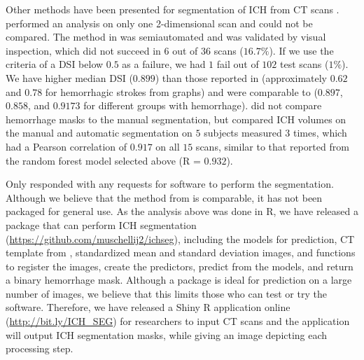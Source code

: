 \documentclass{elsarticle_nonatbib}\usepackage[]{graphicx}\usepackage[]{color}
\begin{document}
Other methods have been presented for segmentation of ICH from CT scans \citep{ gillebert_automated_2014, prakash_segmentation_2012, loncaric_hierarchical_1996, loncaric_quantitative_1999, perez_set_2007}.  \citet{loncaric_hierarchical_1996} performed an analysis on only one 2-dimensional scan and could not be compared.  The method in \citet{perez_set_2007} was semiautomated and was validated by visual inspection, which did not succeed in $6$ out of $36$ scans ($16.7\%$).  If we use the criteria of a DSI below $0.5$ as a failure, we had $1$ fail out of $102$ test scans ($1\%$).  We have higher median DSI ($0.899$) than those reported in \citet{gillebert_automated_2014} (approximately $0.62$ and $0.78$ for hemorrhagic strokes from graphs) and were comparable to \citep{prakash_segmentation_2012} ($0.897$, $0.858$, and $0.9173$ for different groups with hemorrhage). \citet{loncaric_quantitative_1999} did not compare hemorrhage masks to the manual segmentation, but compared ICH volumes on the manual and automatic segmentation on $5$ subjects measured $3$ times, which had a Pearson correlation of $0.917$ on all $15$ scans, similar to that reported from the random forest model selected above (R = $0.932$).  

Only \citet{gillebert_automated_2014} responded with any requests for software to perform the segmentation.  Although we believe that the method from \citet{gillebert_automated_2014} is comparable, it has not been packaged for general use.  As the analysis above was done in R, we have released a package that can perform ICH segmentation (\url{https://github.com/muschellij2/ichseg}), 
including the models for prediction, CT template from \citet{rorden_age-specific_2012}, standardized mean and standard deviation images, and functions to register the images, create the predictors, predict from the models, and return a binary hemorrhage mask.  Although a package is ideal for prediction on a large number of images, we believe that this limits those who can test or try the software.  Therefore, we have released a Shiny \citep{shiny} R application online (\url{http://bit.ly/ICH_SEG}) for researchers to input CT scans and the application will output ICH segmentation masks, while giving an image depicting each processing step.  
\end{document}

